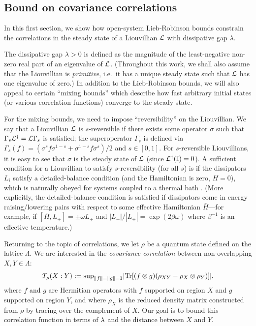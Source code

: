 \subsection{Bound on covariance correlations}
In this first section, we show how open-system Lieb-Robinson bounds constrain the correlations in the steady state of a Liouvillian $\mathcal{L}$ with dissipative gap $\lambda$.

The dissipative gap $\lambda >0$
is defined as the magnitude of the least-negative non-zero real part of an eigenvalue of $\mathcal{L}$.
(Throughout this work, we shall also assume that the Liouvillian is \textit{primitive}, i.e.~it has a unique steady state such that $\mathcal{L}$ has one eigenvalue of zero.)
In addition to the Lieb-Robinson bounds,  we will also appeal to certain ``mixing bounds'' which  describe how fast  arbitrary initial states (or various correlation functions) converge to the steady state.

For the mixing bounds, we need to impose ``reversibility'' on the Liouvillian. We say that a Liouvillian $\mathcal{L}$ is $s$-reversible if there exists some operator $\sigma$ such that $\Gamma_s \mathcal{L}^\dag = \mathcal{L} \Gamma_s$ is satisfied;  the superoperator $\Gamma_s$ is defined via $\Gamma_s(f) = ( \sigma^s f \sigma^{1-s} + \sigma^{1-s} f \sigma^s)/2$ and $s \in[0,1]$. For $s$-reversible Liouvillians, it is easy to see that $\sigma$ is the steady state of $\mathcal{L}$ (since $\mathcal{L}^\dag (\mathbb{I}) = 0$).
A sufficient condition for a Liouvillian to satisfy $s$-reversibility (for all $s$) is if the dissipators  $L_i$ satisfy a detailed-balance condition (and the Hamiltonian is zero, $H=0$), which is naturally obeyed for systems coupled to a thermal bath \cite{Kastoryano2013}. (More explicitly, the detailed-balance condition is satisfied if dissipators come in energy raising/lowering pairs with respect to some effective Hamiltonian $\bar{H}$---for example, if $[\bar{H}, L_{\pm}] = \pm \omega L_{\pm}$ and $|L_-| / |L_+| = \exp(2 \beta \omega)$ where $\beta^{-1}$ is an effective temperature.)

Returning to the topic of correlations, we let $\rho$ be a quantum state defined on the lattice $\Lambda$.
We are interested in the \emph{covariance correlation} between non-overlapping $X,Y \in \Lambda$:
\begin{align}
\label{eq:covcorrdef}
  T_\rho (X:Y) := \text{sup}_{\left\|f\right\| = \left\|g\right\| = 1}|\text{Tr}[(f \otimes g)(\rho_{XY} - \rho_X \otimes \rho_Y) ] |,
\end{align}
where $f$ and $g$ are Hermitian operators with $f$ supported on region $X$ and $g$ supported on region $Y$, and where $\rho_{X}$ is the reduced density matrix constructed from $\rho$ by tracing over the complement of $X$. Our goal is to bound this correlation function in terms of $\lambda$ and the distance between $X$ and $Y$.

